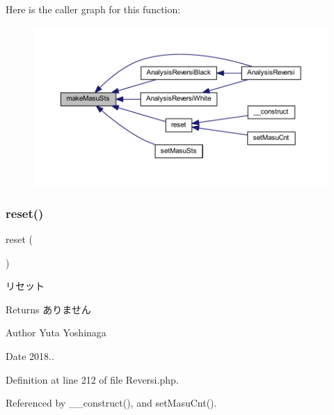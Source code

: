 Here is the caller graph for this function\+:\nopagebreak
\begin{figure}[H]
\begin{center}
\leavevmode
\includegraphics[width=350pt]{class_reversi_a88869682786bb7c45c3488113deaa789_icgraph}
\end{center}
\end{figure}
\mbox{\label{class_reversi_a4a20559544fdf4dcb457e258dc976cf8}} 
\subsubsection{\texorpdfstring{reset()}{reset()}}
{\footnotesize\ttfamily reset (\begin{DoxyParamCaption}{ }\end{DoxyParamCaption})}



リセット 

\begin{DoxyReturn}{Returns}
ありません 
\end{DoxyReturn}
\begin{DoxyAuthor}{Author}
Yuta Yoshinaga 
\end{DoxyAuthor}
\begin{DoxyDate}{Date}
2018.. 
\end{DoxyDate}


Definition at line 212 of file Reversi.\+php.



Referenced by \+\_\+\+\_\+construct(), and set\+Masu\+Cnt().

